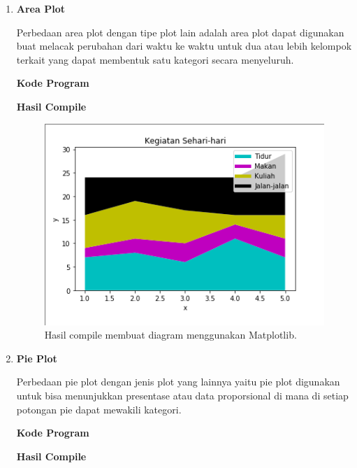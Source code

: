 \begin{enumerate}
	\item \textbf{Area Plot}
	
	Perbedaan area plot dengan tipe plot lain adalah area plot dapat digunakan buat melacak perubahan dari waktu ke waktu untuk dua atau lebih kelompok terkait yang dapat membentuk satu kategori secara menyeluruh.
	
	\textbf{Kode Program}
	
	
	
	\textbf{Hasil Compile}
	
	\begin{figure}[H]
		\includegraphics[width=12cm]{figures/6/1174017/area.png}
		\centering
		\caption{Hasil compile membuat diagram menggunakan Matplotlib.}
	\end{figure}
	
	\item \textbf{Pie Plot}
	
	Perbedaan pie plot dengan jenis plot yang lainnya yaitu pie plot digunakan untuk bisa menunjukkan presentase atau data proporsional di mana di setiap potongan pie dapat mewakili kategori.
	
	\textbf{Kode Program}
	
	
	
	\textbf{Hasil Compile}
	

\end{enumerate}
